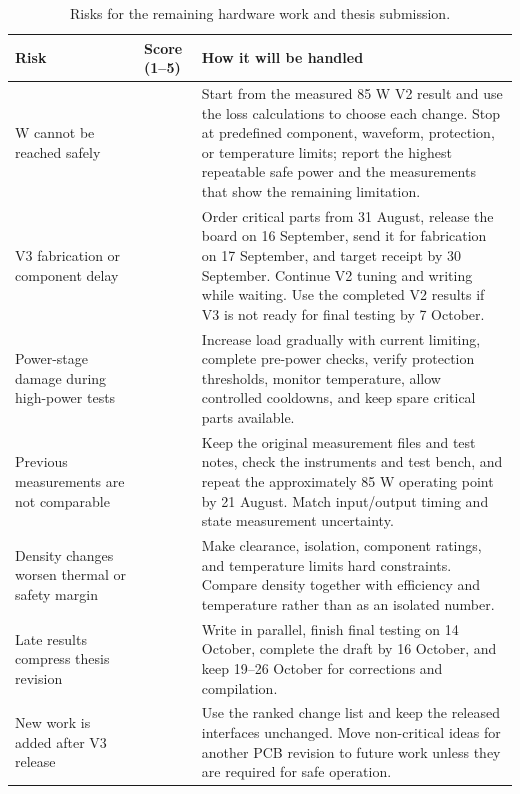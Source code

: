 \documentclass[12pt,a4paper]{report}
\begin{document}
\begin{table}[H]
\centering
\footnotesize
\begin{tabular}{>{\raggedright\arraybackslash}p{3.2cm} >{\raggedright\arraybackslash}p{1.2cm} >{\raggedright\arraybackslash}p{9.8cm}}
\toprule
Risk & Score (1--5) & How it will be handled \\
\midrule
100 W cannot be reached safely & 5 & Start from the measured 85 W V2 result and use the loss calculations to choose each change. Stop at predefined component, waveform, protection, or temperature limits; report the highest repeatable safe power and the measurements that show the remaining limitation. \\
V3 fabrication or component delay & 4 & Order critical parts from 31 August, release the board on 16 September, send it for fabrication on 17 September, and target receipt by 30 September. Continue V2 tuning and writing while waiting. Use the completed V2 results if V3 is not ready for final testing by 7 October. \\
Power-stage damage during high-power tests & 4 & Increase load gradually with current limiting, complete pre-power checks, verify protection thresholds, monitor temperature, allow controlled cooldowns, and keep spare critical parts available. \\
Previous measurements are not comparable & 4 & Keep the original measurement files and test notes, check the instruments and test bench, and repeat the approximately 85 W operating point by 21 August. Match input/output timing and state measurement uncertainty. \\
Density changes worsen thermal or safety margin & 4 & Make clearance, isolation, component ratings, and temperature limits hard constraints. Compare density together with efficiency and temperature rather than as an isolated number. \\
Late results compress thesis revision & 4 & Write in parallel, finish final testing on 14 October, complete the draft by 16 October, and keep 19--26 October for corrections and compilation. \\
New work is added after V3 release & 3 & Use the ranked change list and keep the released interfaces unchanged. Move non-critical ideas for another PCB revision to future work unless they are required for safe operation. \\
\bottomrule
\end{tabular}
\caption{Risks for the remaining hardware work and thesis submission.}
\end{table}
\end{document}
